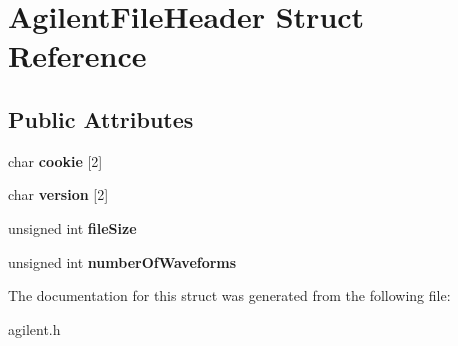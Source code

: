 \hypertarget{structAgilentFileHeader}{
\section{AgilentFileHeader Struct Reference}
\label{structAgilentFileHeader}
}
\subsection*{Public Attributes}
\begin{DoxyCompactItemize}
\item 
\hypertarget{structAgilentFileHeader_a37d2a2ba49b57c75b6c75af31b6f4a01}{
char {\bfseries cookie} \mbox{[}2\mbox{]}}
\label{structAgilentFileHeader_a37d2a2ba49b57c75b6c75af31b6f4a01}

\item 
\hypertarget{structAgilentFileHeader_a423128ac859cadd50e33cf54c360cb99}{
char {\bfseries version} \mbox{[}2\mbox{]}}
\label{structAgilentFileHeader_a423128ac859cadd50e33cf54c360cb99}

\item 
\hypertarget{structAgilentFileHeader_a6a604a1ab6043cbf292bf67af4a58d86}{
unsigned int {\bfseries fileSize}}
\label{structAgilentFileHeader_a6a604a1ab6043cbf292bf67af4a58d86}

\item 
\hypertarget{structAgilentFileHeader_a587d1494b292eea88f8c0876453cf081}{
unsigned int {\bfseries numberOfWaveforms}}
\label{structAgilentFileHeader_a587d1494b292eea88f8c0876453cf081}

\end{DoxyCompactItemize}


The documentation for this struct was generated from the following file:\begin{DoxyCompactItemize}
\item 
agilent.h\end{DoxyCompactItemize}
